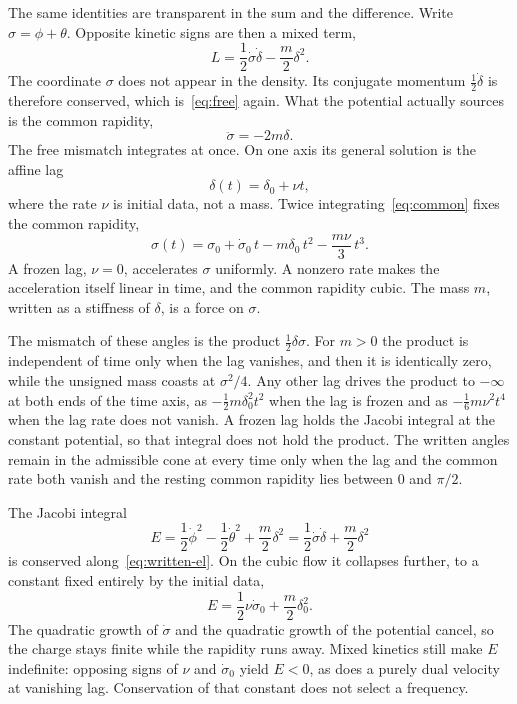 \documentclass[a4paper]{article}
\begin{document}
The same identities are transparent in the sum and the difference. Write \(\sigma=\phi+\theta\). Opposite kinetic signs are then a mixed term,
\begin{equation}
L
  =\frac12\dot\sigma\dot\delta
  -\frac m2\delta^2.
\label{eq:mixed}
\end{equation}
The coordinate \(\sigma\) does not appear in the density. Its conjugate momentum \(\frac12\dot\delta\) is therefore conserved, which is~\eqref{eq:free} again. What the potential actually sources is the common rapidity,
\begin{equation}
\ddot\sigma=-2m\delta.
\label{eq:common}
\end{equation}
The free mismatch integrates at once. On one axis its general solution is the affine lag
\begin{equation}
\delta(t)=\delta_0+\nu t,
\label{eq:affine}
\end{equation}
where the rate \(\nu\) is initial data, not a mass. Twice integrating~\eqref{eq:common} fixes the common rapidity,
\begin{equation}
\sigma(t)
  =\sigma_0+\dot\sigma_0\,t
  -m\delta_0\,t^2
  -\frac{m\nu}{3}\,t^3.
\label{eq:cubic}
\end{equation}
A frozen lag, \(\nu=0\), accelerates \(\sigma\) uniformly. A nonzero rate makes the acceleration itself linear in time, and the common rapidity cubic. The mass \(m\), written as a stiffness of \(\delta\), is a force on \(\sigma\).

The mismatch of these angles is the product \(\tfrac12\delta\sigma\). For \(m>0\) the product is independent of time only when the lag vanishes, and then it is identically zero, while the unsigned mass coasts at \(\sigma^2/4\). Any other lag drives the product to \(-\infty\) at both ends of the time axis, as \(-\tfrac12 m\delta_0^2 t^2\) when the lag is frozen and as \(-\tfrac16 m\nu^2 t^4\) when the lag rate does not vanish. A frozen lag holds the Jacobi integral at the constant potential, so that integral does not hold the product. The written angles remain in the admissible cone at every time only when the lag and the common rate both vanish and the resting common rapidity lies between \(0\) and \(\pi/2\).

The Jacobi integral
\[
E
  =\frac12\dot\phi^2
  -\frac12\dot\theta^2
  +\frac m2\delta^2
  =\frac12\dot\sigma\dot\delta
  +\frac m2\delta^2
\]
is conserved along~\eqref{eq:written-el}. On the cubic flow it collapses further, to a constant fixed entirely by the initial data,
\[
E=\frac12\nu\dot\sigma_0+\frac m2\delta_0^2.
\]
The quadratic growth of \(\dot\sigma\) and the quadratic growth of the potential cancel, so the charge stays finite while the rapidity runs away. Mixed kinetics still make \(E\) indefinite: opposing signs of \(\nu\) and \(\dot\sigma_0\) yield \(E<0\), as does a purely dual velocity at vanishing lag. Conservation of that constant does not select a frequency.
\end{document}
